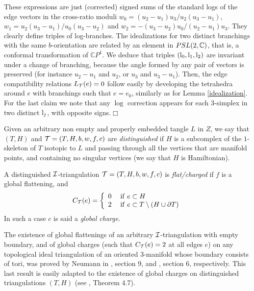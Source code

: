 These expressions are just (corrected)
signed sums of the standard logs of the edge vectors in the
cross-ratio moduli $w_0=(u_2-u_1)u_3/u_2(u_3-u_1)$,
$w_1=u_2(u_3-u_1)/u_0(u_3-u_2)$ and
$w_2=-(u_3-u_2)u_0/(u_2-u_1)u_3$. They clearly define triples of
log-branches. The idealizations for two distinct branchings with
the same $b$-orientation are related by an element in
$PSL(2,\mathbb{C})$, that is, a conformal transformation of
$\mathbb{C}P^1$. We deduce that triples $({\rm l}_0,{\rm l}_1,{\rm
l}_2)$ are invariant under a change of branching, because the
angle formed by any pair of vectors is preserved (for instance
$u_2-u_1$ and $u_2$, or $u_3$ and $u_3-u_1$). Then, the edge
compatibility relations $L_{\mathcal T}(e)=0$ follow easily by developing
the tetrahedra around $e$ with branchings such that $e=e_0$,
similarly as for Lemma \ref{idealization}. For the last claim we
note that any $\log$ correction appears for each $3$-simplex in
two distinct ${\rm l}_j$, with opposite signs.\hfill$\Box$
\medskip

Given an arbitrary non empty and properly embedded tangle $L$ in
$Z$, we say that $(T,H)$ and ${\mathcal T}=(T,H,b,w,f,c)$ are {\it
distinguished} if $H$ is a subcomplex of the $1$-skeleton of $T$
isotopic to $L$ and passing through all the vertices that are
manifold points, and containing no singular vertices (we say that
$H$ is Hamiltonian).
\begin{defi}\label{DISFLATCHARGE}{\rm A distinguished ${\mathcal I}$-triangulation
${\mathcal T}=(T,H,b,w,f,c)$ is {\it flat/charged} if $f$ is a global flattening,
and
\begin{equation}\label{condc}C_{{\mathcal T}}(e)=\left
\lbrace\begin{array}{l} 0\\ 2\end{array}\right.\begin{array}{l}
{\rm if}\ e \subset H\\ {\rm if}\ e \subset T\setminus(H \cup
\partial T)\end{array}
\end{equation} In such a case $c$ is said a {\it global charge}.}
\end{defi}
The existence of global flattenings of an arbitrary ${\mathcal I}$-triangulation with
empty boundary, and of global charges (such that $C_{\mathcal T}(e)=2$ at all
edges $e$) on any topological ideal triangulation of an oriented
$3$-manifold whose boundary consists of tori, was proved by Neumann in
\cite{N}, section 9, and \cite{N0}, section 6, respectively. This last
result is easily adapted to the existence of global charges on
distinguished triangulations $(T,H)$ (see \cite{BB1}, Theorem 4.7).
\smallskip


